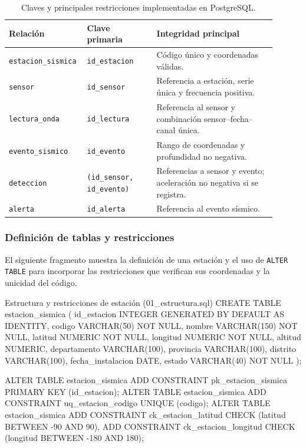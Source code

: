 \documentclass[12pt,a4paper]{article}
\begin{document}
\begin{table}[H]
\centering
\small
\begin{tabular}{@{}>{\raggedright\arraybackslash}p{0.22\linewidth}>{\raggedright\arraybackslash}p{0.25\linewidth}>{\raggedright\arraybackslash}p{0.43\linewidth}@{}}
\toprule
\textbf{Relación} & \textbf{Clave primaria} & \textbf{Integridad principal} \\
\midrule
\texttt{estacion\_sismica} & \texttt{id\_estacion} & Código único y coordenadas válidas. \\
\texttt{sensor} & \texttt{id\_sensor} & Referencia a estación, serie única y frecuencia positiva. \\
\texttt{lectura\_onda} & \texttt{id\_lectura} & Referencia al sensor y combinación sensor--fecha--canal única. \\
\texttt{evento\_sismico} & \texttt{id\_evento} & Rango de coordenadas y profundidad no negativa. \\
\texttt{deteccion} & \texttt{(id\_sensor, id\_evento)} & Referencias a sensor y evento; aceleración no negativa si se registra. \\
\texttt{alerta} & \texttt{id\_alerta} & Referencia al evento sísmico. \\
\bottomrule
\end{tabular}
\caption{Claves y principales restricciones implementadas en PostgreSQL.}
\label{tab:estructura-resumen-41}
\end{table}

\subsubsection*{Definición de tablas y restricciones}

El siguiente fragmento muestra la definición de una estación y el uso
 de \texttt{ALTER TABLE} para incorporar las restricciones que verifican
 sus coordenadas y la unicidad del código.

\begin{sqlbloque}{Estructura y restricciones de estación (01\_estructura.sql)}
CREATE TABLE estacion_sismica (
    id_estacion INTEGER GENERATED BY DEFAULT AS IDENTITY,
    codigo VARCHAR(50) NOT NULL,
    nombre VARCHAR(150) NOT NULL,
    latitud NUMERIC NOT NULL,
    longitud NUMERIC NOT NULL,
    altitud NUMERIC,
    departamento VARCHAR(100),
    provincia VARCHAR(100),
    distrito VARCHAR(100),
    fecha_instalacion DATE,
    estado VARCHAR(40) NOT NULL
);

ALTER TABLE estacion_sismica
    ADD CONSTRAINT pk_estacion_sismica PRIMARY KEY (id_estacion);
ALTER TABLE estacion_sismica
    ADD CONSTRAINT uq_estacion_codigo UNIQUE (codigo);
ALTER TABLE estacion_sismica
    ADD CONSTRAINT ck_estacion_latitud CHECK (latitud BETWEEN -90 AND 90),
    ADD CONSTRAINT ck_estacion_longitud CHECK (longitud BETWEEN -180 AND 180);
\end{sqlbloque}
\end{document}
